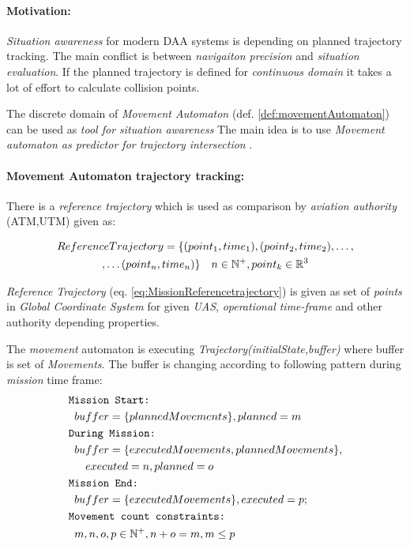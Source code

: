 \paragraph{Motivation:} \emph{Situation awareness} for modern DAA systems is depending on planned trajectory tracking. The main conflict is between \emph{navigaiton precision} and \emph{situation evaluation}. If the planned trajectory is defined for \emph{continuous domain} it takes a lot of effort to calculate collision points. 

The discrete domain of \emph{Movement Automaton} (def. \ref{def:movementAutomaton}) can be used as \emph{tool for situation awareness} The main idea is to use \emph{Movement automaton as predictor for trajectory intersection} \cite{frazzoli2000trajectory,frazzoli2001robust}.

\paragraph{Movement Automaton trajectory tracking:} There is a \emph{reference trajectory} which is used as comparison by \emph{aviation authority} (ATM,UTM) given as:

\begin{multline}\label{eq:MissionReferencetrajectory}
    Reference Trajectory = \{(point_1,time_1), (point_2,time_2),\dots,\\,\dots(point_n,time_n)\} \quad n\in\mathbb{N}^+, point_k\in \mathbb{R}^3
\end{multline}

\emph{Reference Trajectory} (eq. \ref{eq:MissionReferencetrajectory}) is given as set of \emph{points} in \emph{Global Coordinate System} for given \emph{UAS}, \emph{operational time-frame} and other authority depending properties.

The \emph{movement} automaton is executing \emph{Trajectory(initialState,buffer)} where buffer is set of \emph{Movements}. The buffer is changing according to following pattern during \emph{mission} time frame:
\begin{equation}\label{eq:BufferEvolutionMission}
    \begin{aligned}
    \texttt{M}&\texttt{ission Start:}\\
    &buffer=\{planned Movements\},planned= m\\
    \texttt{D}&\texttt{uring Mission:}\\
    &buffer=\{executedMovements,plannedMovements\}, \\
    &\quad executed = n, planned =o\\
    \texttt{M}&\texttt{ission End:}\\
    &buffer=\{executedMovements\},executed = p;\\
    \texttt{M}&\texttt{ovement count constraints:}\\
    &m,n,o,p \in \mathbb{N}^+, n+o =m, m\le p
    \end{aligned}
\end{equation}

